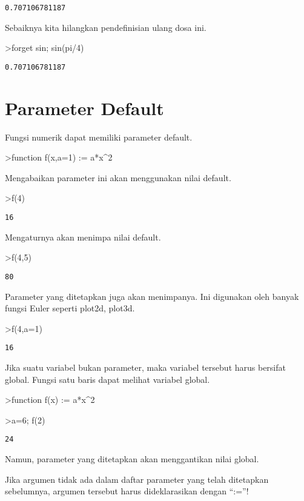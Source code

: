 \documentclass[
]{book}
\begin{document}
\begin{verbatim}
0.707106781187
\end{verbatim}

Sebaiknya kita hilangkan pendefinisian ulang dosa ini.

\textgreater forget sin; sin(pi/4)

\begin{verbatim}
0.707106781187
\end{verbatim}

\section{Parameter Default}\label{parameter-default}

Fungsi numerik dapat memiliki parameter default.

\textgreater function f(x,a=1) := a*x\^{}2

Mengabaikan parameter ini akan menggunakan nilai default.

\textgreater f(4)

\begin{verbatim}
16
\end{verbatim}

Mengaturnya akan menimpa nilai default.

\textgreater f(4,5)

\begin{verbatim}
80
\end{verbatim}

Parameter yang ditetapkan juga akan menimpanya. Ini digunakan oleh banyak fungsi Euler seperti plot2d, plot3d.

\textgreater f(4,a=1)

\begin{verbatim}
16
\end{verbatim}

Jika suatu variabel bukan parameter, maka variabel tersebut harus bersifat global. Fungsi satu baris dapat melihat variabel global.

\textgreater function f(x) := a*x\^{}2

\textgreater a=6; f(2)

\begin{verbatim}
24
\end{verbatim}

Namun, parameter yang ditetapkan akan menggantikan nilai global.

Jika argumen tidak ada dalam daftar parameter yang telah ditetapkan sebelumnya, argumen tersebut harus dideklarasikan dengan ``:=''!
\end{document}
